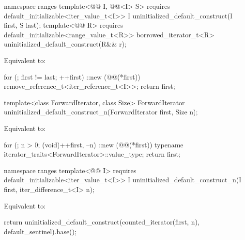 %
\begin{itemdecl}
namespace ranges {
  template<@@ I, @@<I> S>
      requires default_initializable<iter_value_t<I>>
    I uninitialized_default_construct(I first, S last);
  template<@@ R>
      requires default_initializable<range_value_t<R>>
    borrowed_iterator_t<R> uninitialized_default_construct(R&& r);
}
\end{itemdecl}

\begin{itemdescr}
\pnum
\effects
Equivalent to:
\begin{codeblock}
for (; first != last; ++first)
  ::new (@@(*first)) remove_reference_t<iter_reference_t<I>>;
return first;
\end{codeblock}
\end{itemdescr}

%
\begin{itemdecl}
template<class ForwardIterator, class Size>
  ForwardIterator uninitialized_default_construct_n(ForwardIterator first, Size n);
\end{itemdecl}

\begin{itemdescr}
\pnum
\effects
Equivalent to:
\begin{codeblock}
for (; n > 0; (void)++first, --n)
  ::new (@@(*first))
    typename iterator_traits<ForwardIterator>::value_type;
return first;
\end{codeblock}
\end{itemdescr}

%
\begin{itemdecl}
namespace ranges {
  template<@@ I>
      requires default_initializable<iter_value_t<I>>
    I uninitialized_default_construct_n(I first, iter_difference_t<I> n);
}
\end{itemdecl}

\begin{itemdescr}
\pnum
\effects
Equivalent to:
\begin{codeblock}
return uninitialized_default_construct(counted_iterator(first, n),
                                       default_sentinel).base();
\end{codeblock}
\end{itemdescr}

